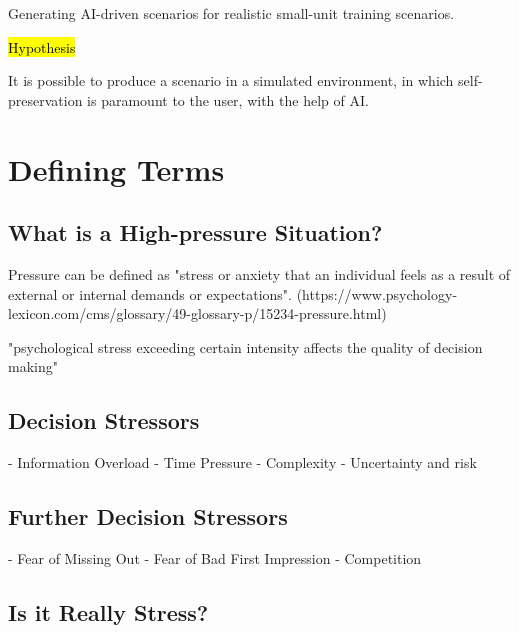 \documentclass{article}
\begin{document}
  Generating AI-driven scenarios for realistic small-unit training scenarios. 
  
  \hl{Hypothesis}
  
  It is possible to produce a scenario in a simulated environment, in which self-preservation is paramount to the user, with the help of AI.
  
  
  \section{Defining Terms}

  \subsection{What is a High-pressure Situation?}

  Pressure can be defined as "stress or anxiety that an individual feels as a result of external or internal demands or expectations". (https://www.psychology-lexicon.com/cms/glossary/49-glossary-p/15234-pressure.html)

  "psychological stress exceeding certain intensity affects the quality of decision making" %
    


      \subsection{Decision Stressors}

      - Information Overload
      - Time Pressure
      - Complexity
      - Uncertainty and risk

      \subsection{Further Decision Stressors}

      - Fear of Missing Out
      - Fear of Bad First Impression
      - Competition


  \subsection{Is it Really Stress?}
\end{document}
